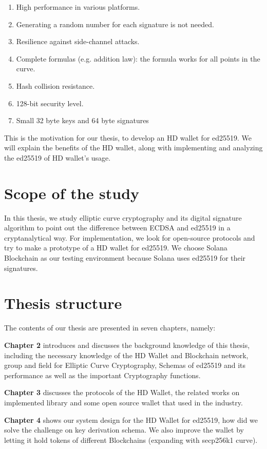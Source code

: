 \begin{enumerate}
    \item High performance in various platforms.   
    \item Generating a random number for each signature is not needed.
    \item Resilience against side-channel attacks.
    \item Complete formulas (e.g. addition law): the formula works for all points in the curve.
    \item Hash collision resistance.
    \item 128-bit security level.
    \item Small 32 byte keys and 64 byte signatures
\end{enumerate}
This is the motivation for our thesis, to develop an HD wallet for ed25519. We will explain the benefits of the HD wallet, along with implementing and analyzing the ed25519 of HD wallet’s usage. 

\section{Scope of the study}

In this thesis, we study elliptic curve cryptography and its digital signature algorithm to point out the difference between ECDSA and ed25519 in a cryptanalytical way. For implementation, we look for open-source protocols and try to make a prototype of a HD wallet for ed25519. We choose Solana Blockchain as our testing environment because Solana uses ed25519 for their signatures.

\section{Thesis structure}

The contents of our thesis are presented in seven chapters, namely:

\textbf{Chapter 2} introduces and discusses the background knowledge of this thesis, including the necessary knowledge of the HD Wallet and Blockchain network, group and field for Elliptic Curve Cryptography, Schemas of ed25519 and its performance as well as the important Cryptography functions.

\textbf{Chapter 3} discusses the protocols of the HD Wallet, the related works on implemented library and some open source wallet that used in the industry. 

\textbf{Chapter 4} shows our system design for the HD Wallet for ed25519, how did we solve the challenge on key derivation schema. We also improve the wallet by letting it hold tokens of different Blockchains (expanding with secp256k1 curve).

